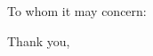 \documentclass{ucbletter}
\begin{document}
\address{ } %
%
\signature{Kelly Rowland}
\begin{letter}{}
\opening{To whom it may concern:}

\lipsum[1-5]

\closing{Thank you,}
\end{letter}
\end{document}
